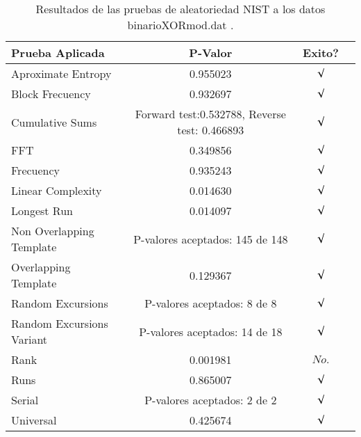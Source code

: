 \documentclass[12pt,3p]{elsarticle}
\begin{document}
\begin{table}[H]
\caption{Resultados de las pruebas de aleatoriedad NIST a los datos binarioXORmod.dat .}
\label{sample-table}
\vskip 0.15in
\begin{center}
\begin{small}
\begin{sc}
\begin{tabular}{lccr}
\hline

Prueba Aplicada &  P-Valor & Exito? \\
\hline

Aproximate Entropy    &   0.955023  & $\surd$ \\

Block Frecuency  & 0.932697  &  $\surd$  \\

Cumulative Sums    &   Forward test:0.532788, Reverse test: 0.466893  & $\surd$ \\

FFT    &   0.349856 &   $\surd$      \\

Frecuency     &  0.935243 &  $\surd$   \\

Linear Complexity      &  0.014630  & $\surd$ \\

Longest Run      &  0.014097 &    $\surd$      \\

Non Overlapping Template      & P-valores aceptados: 145 de 148    &     $\surd$          \\

Overlapping Template      &  0.129367  &        $\surd$       \\

Random Excursions      &  P-valores aceptados: 8 de 8  &      $\surd$          \\

Random Excursions Variant &  P-valores aceptados: 14 de 18  &     $\surd$        \\

Rank &    0.001981  &       $ No. $      \\

Runs &    0.865007  &     $\surd$        \\

Serial &     P-valores aceptados: 2 de 2    &     $\surd$        \\

Universal &      0.425674 &   $\surd$            \\

\hline



\end{tabular}
\end{sc}
\end{small}
\end{center}
\vskip -0.1in
\end{table}
\end{document}
